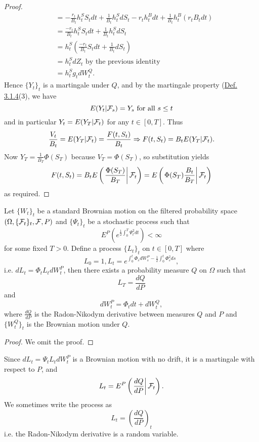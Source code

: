 \documentclass[11pt,fleqn]{book} %
\begin{document}
\begin{proof}
\[\begin{aligned}
&= -\frac{r_t}{B_t}h_t^SS_tdt + \frac{1}{B_t}h_t^SdS_t - r_th_t^Bdt + \frac{1}{B_t}h_t^B(r_tB_tdt) \\
&= \frac{-r_t}{B_t}h_t^SS_tdt + \frac{1}{B_t}h_t^SdS_t \\
&= h_t^S\left(\frac{-r_t}{B_t}S_tdt + \frac{1}{B_t}dS_t\right) \\
&= h_t^SdZ_t \text{ by the previous identity} \\
&= h_t^Sg_tdW_t^Q.
\end{aligned}
\]
\indent Hence \(\{Y_t\}_t\) is a martingale under \(Q\), and by the martingale property (\hyperref[def:314]{Def. 3.1.4}(3), we have
\[
E(Y_t | \mathcal{F}_s) = Y_s \text{ for all } s \leq t
\]
and in particular \(Y_t = E(Y_T|\mathcal{F}_t)\) for any \(t \in [0, T]\). Thus
\[
\frac{V_t}{B_t} = E(Y_T|\mathcal{F}_t) = \frac{F(t, S_t)}{B_t} \Rightarrow F(t, S_t) = B_tE(Y_T|\mathcal{F}_t).
\]
\indent Now \(Y_T = \frac{1}{B_T}\Phi(S_T)\) because \(V_T = \Phi(S_T)\), so substitution yields
\[
F(t, S_t) = B_tE\left(\left.\frac{\Phi(S_T)}{B_T}\right|\mathcal{F}_t\right) = E\left(\left.\Phi(S_T)\frac{B_t}{B_T}\right|\mathcal{F}_t\right)
\]
as required.
\end{proof}

\begin{theorem} \label{thm:429}
Let \(\{W_t\}_t\) be a standard Brownian motion on the filtered probability space \((\Omega, \{\mathcal{F}_t\}_t, \mathcal{F}, P)\) and \(\{\Psi_t\}_t\) be a stochastic process such that
\[
E^P\left(e^{\frac12\int_0^T \Psi_t^2dt}\right) < \infty
\]
for some fixed \(T > 0\). Define a process \(\{L_t\}_t\) on \(t \in [0, T]\) where
\[
L_0 = 1, L_t = e^{\int_0^t\Phi_sdW_s^P - \frac12\int_0^t\Phi_s^2ds},
\]
i.e. \(dL_t = \Phi_tL_tdW_t^P\), then there exists a probability measure \(Q\) on \(\Omega\) such that
\[
L_T = \frac{dQ}{dP}
\]
and
\[
dW_t^P = \Phi_tdt + dW_t^Q,
\]
where \(\frac{dQ}{dP}\) is the Radon-Nikodym derivative between measures \(Q\) and \(P\) and \(\{W_t^Q\}_t\) is the Brownian motion under \(Q\).
\end{theorem}
\begin{proof}
    We omit the proof.
\end{proof}

\begin{remark} \label{rmk;4210}
Since \(dL_t = \Psi_tL_tdW_t^P\) is a Brownian motion with no drift, it is a martingale with respect to \(P\), and
\[
L_t = E^P\left(\left.\frac{dQ}{dP}\right|\mathcal{F}_t\right).
\]
\indent We sometimes write the process as
\[
L_t = \left(\frac{dQ}{dP}\right)_t
\]
i.e. the Radon-Nikodym derivative is a random variable.
\end{remark}
\end{document}
